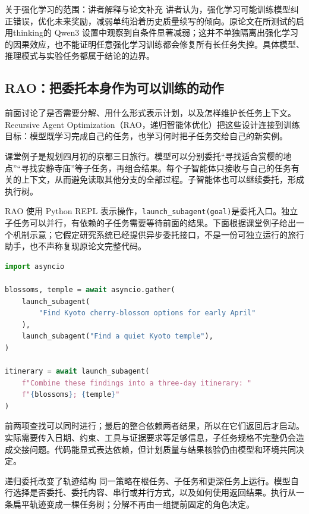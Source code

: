 \documentclass[11pt,a4paper]{article}
\begin{document}
\begin{knowledgebox}{关于强化学习的范围：讲者解释与论文补充}
讲者认为，强化学习可能训练模型纠正错误，优化未来奖励，减弱单纯沿着历史质量续写的倾向。原论文在所测试的启用thinking的 Qwen3 设置中观察到自条件显著减弱；这并不单独隔离出强化学习的因果效应，也不能证明任意强化学习训练都会修复所有长任务失控。具体模型、推理模式与实验任务都属于结论的边界。
\end{knowledgebox}

\subsection{RAO：把委托本身作为可以训练的动作}
前面讨论了是否需要分解、用什么形式表示计划，以及怎样维护长任务上下文。Recursive Agent Optimization（RAO，递归智能体优化）把这些设计连接到训练目标：模型既学习完成自己的任务，也学习何时把子任务交给自己的新实例。

课堂例子是规划四月初的京都三日旅行。模型可以分别委托“寻找适合赏樱的地点”“寻找安静寺庙”等子任务，再组合结果。每个子智能体只接收与自己的任务有关的上下文，从而避免读取其他分支的全部过程。子智能体也可以继续委托，形成执行树。

RAO 使用 Python REPL 表示操作，\texttt{launch\_subagent(goal)}是委托入口。独立子任务可以并行，有依赖的子任务需要等待前面的结果。下面根据课堂例子给出一个机制示意；它假定研究系统已经提供异步委托接口，不是一份可独立运行的旅行助手，也不声称复现原论文完整代码。

\par\noindent\begin{minipage}{\textwidth}
\begin{lstlisting}[language=Python,caption={递归委托中的并行与依赖；依据课堂京都例子编写的教学示意}]
import asyncio

blossoms, temple = await asyncio.gather(
    launch_subagent(
        "Find Kyoto cherry-blossom options for early April"
    ),
    launch_subagent("Find a quiet Kyoto temple"),
)

itinerary = await launch_subagent(
    f"Combine these findings into a three-day itinerary: "
    f"{blossoms}; {temple}"
)
\end{lstlisting}
\end{minipage}

前两项查找可以同时进行；最后的整合依赖两者结果，所以在它们返回后才启动。实际需要传入日期、约束、工具与证据要求等足够信息，子任务规格不完整仍会造成交接问题。代码能显式表达依赖，但计划质量与结果核验仍由模型和环境共同决定。

\begin{importantbox}{递归委托改变了轨迹结构}
同一策略在根任务、子任务和更深任务上运行。模型自行选择是否委托、委托内容、串行或并行方式，以及如何使用返回结果。执行从一条扁平轨迹变成一棵任务树；分解不再由一组提前固定的角色决定。
\end{importantbox}
\end{document}
